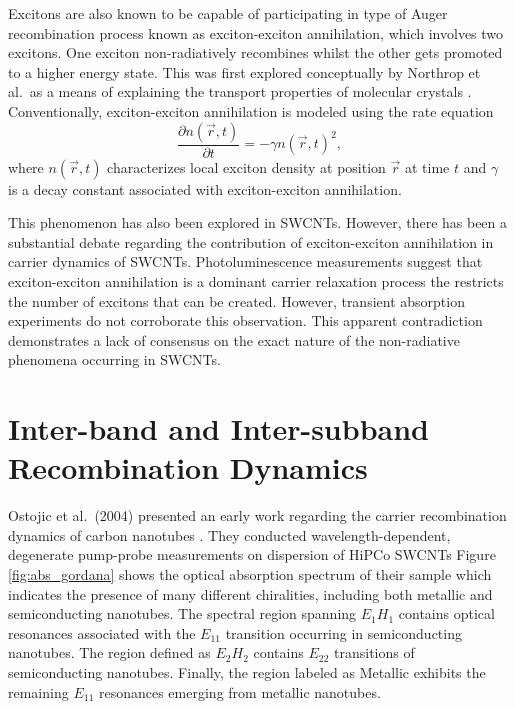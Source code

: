 Excitons are also known to be capable of participating in type of Auger recombination process known as exciton-exciton annihilation, which involves two excitons. One exciton non-radiatively recombines whilst the other gets promoted to a higher energy state. This was first explored conceptually by Northrop et al.\ as a means of explaining the transport properties of molecular crystals \cite{northrop1958electronic}. Conventionally, exciton-exciton annihilation is modeled using the rate equation
%
\begin{equation}
	\frac{\partial n(\vec{r}, t)}{\partial t} = - \gamma n(\vec{r}, t)^2,
	\label{eq:rate_eq_exc_anih}
\end{equation}
%
where $n(\vec{r}, t)$ characterizes local exciton density at position $\vec{r}$ at time $t$ and $\gamma$ is a decay constant associated with exciton-exciton annihilation.

This phenomenon has also been explored in SWCNTs. However, there has been a substantial debate regarding the contribution of exciton-exciton annihilation in carrier dynamics of SWCNTs. Photoluminescence measurements suggest that exciton-exciton annihilation is a dominant carrier relaxation process the restricts the number of excitons that can be created. However, transient absorption experiments do not corroborate this observation. This apparent contradiction demonstrates a lack of consensus on the exact nature of the non-radiative phenomena occurring in SWCNTs.

\section{Inter-band and Inter-subband Recombination Dynamics}

Ostojic et al.\ (2004) presented an early work regarding the carrier recombination dynamics of carbon nanotubes \cite{ostojic2004interband}. They conducted wavelength-dependent, degenerate pump-probe measurements on dispersion of HiPCo SWCNTs %
Figure \ref{fig:abs_gordana} shows the optical absorption spectrum of their sample which indicates the presence of many different chiralities, including both metallic and semiconducting nanotubes. The spectral region spanning $E_{1} H_{1}$ contains optical resonances associated with the $E_{11}$ transition occurring in semiconducting nanotubes. The region defined as $E_{2} H_{2}$ contains $E_{22}$ transitions of semiconducting nanotubes. Finally, the region labeled as Metallic exhibits the remaining $E_{11}$ resonances emerging from metallic nanotubes.

